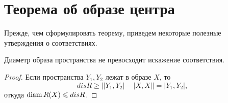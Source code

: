 
\section{Теорема об образе центра}
Прежде, чем сформулировать теорему, приведем некоторые полезные
утверждения о соответствиях.
\begin{lemma}
	Диаметр образа пространства не превосходит
	искажение соответствия.
	\label{lemDiamImage}
  \end{lemma}
\begin{proof}
	Если пространства $Y_{1}, Y_{2}$ лежат в образе $X$, то
	\[dis R \ge \big| \left|Y_{1},Y_{2}\right| - |X,X|\big| = |Y_{1}, Y_{2}|,\]
	откуда $\operatorname{diam} R(X) \leqslant dis R$.
\end{proof}

